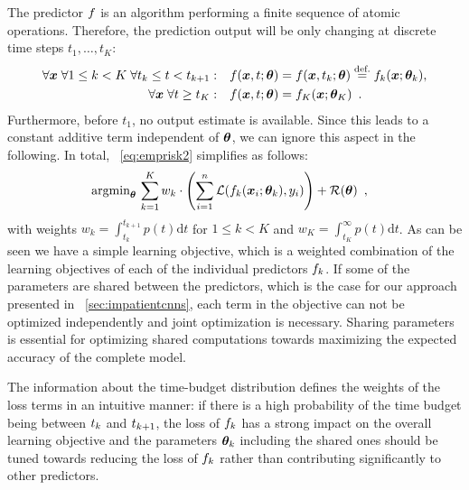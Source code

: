 \documentclass{bmvc2k}
\begin{document}
    The predictor $f$ is an algorithm performing a finite sequence of atomic operations. Therefore,
    the prediction output will be only changing at discrete time steps $t_1, \ldots, t_K$:
    \begin{align}
        \forall \bm{x} \;\forall 1 \leq k < K\; \forall t_k \leq t < t_{k+1}:\quad& f(\bm{x}, t; \bm{\theta}) = f(\bm{x}, t_k; \bm{\theta}) \stackrel{\text{def.}}{=} f_k(\bm{x}; \bm{\theta}_k),\\
        \forall \bm{x} \; \forall t \geq t_K:\quad& f(\bm{x}, t; \bm{\theta}) = f_K(\bm{x}; \bm{\theta}_K)\enspace.
    \end{align}
    Furthermore, before $t_1$, no output estimate is available. Since this leads to a constant additive term independent
    of $\bm{\theta}$, we can ignore this aspect in the following.
    In total, \equationname~\eqref{eq:emprisk2} simplifies as follows:
    \begin{align}
        \label{eq:emprisk3}
        &\operatorname{\text{argmin}}_{\bm{\theta}}\, \sum\limits_{k=1}^{K} w_k \cdot \left( \sum\limits_{i=1}^{n}
    \mathcal{L}( f_k(\bm{x}_i; \bm{\theta}_k), y_i ) \right) + \mathcal{R}(\bm{\theta}) \enspace,
    \end{align}
    with weights $w_k = \int_{t_k}^{t_{k+1}} p(t) \mathrm{d}t$ for $1 \leq k < K$ and $w_K = \int_{t_K}^{\infty} p(t) \mathrm{d}t$.
    As can be seen we have a simple learning objective, which is a weighted combination of the learning objectives of each of the
    individual predictors $f_k$. If some of the parameters are shared between the predictors, which is the case for our approach presented in \sectionname~\ref{sec:impatientcnns},
    each term in the objective can not be optimized independently and joint optimization is necessary.
    Sharing parameters is essential for optimizing shared computations towards maximizing the expected accuracy of the complete model.

    The information about the time-budget distribution defines the weights of the loss terms in an intuitive manner:
    if there is a high probability of the time budget being between
    $t_{k}$ and $t_{k+1}$, the loss of $f_k$ has a strong impact on the overall learning objective and
    the parameters $\bm{\theta}_k$ including the shared ones should be tuned towards reducing the loss of $f_k$ rather
    than contributing significantly to other predictors.
\end{document}
